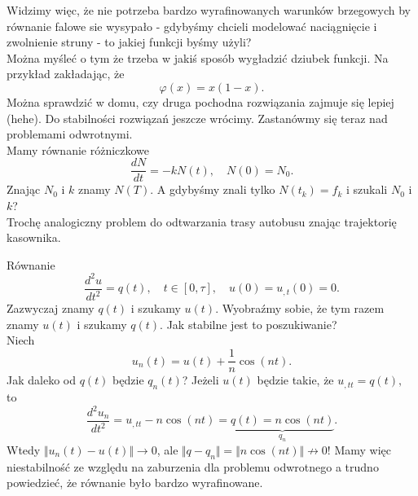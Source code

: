 \documentclass[../main.tex]{subfiles}
\begin{document}
				 Widzimy więc, że nie potrzeba bardzo wyrafinowanych warunków brzegowych by równanie falowe sie wysypało - gdybyśmy chcieli modelować naciągnięcie i zwolnienie struny - to jakiej funkcji byśmy użyli?\\
				Można myśleć o tym że trzeba w jakiś sposób wygładzić dziubek funkcji.
				Na przykład zakładając, że
				\[
						\varphi(x) = x(1-x)
				.\]
				Można sprawdzić w domu, czy druga pochodna rozwiązania zajmuje się lepiej (hehe). Do stabilności rozwiązań jeszcze wrócimy. Zastanówmy się teraz nad problemami odwrotnymi.
				\\
				Mamy równanie różniczkowe
				\[
						\frac{dN}{dt}= -k N(t),\quad N(0) = N_0
				.\]
				Znając $N_0$ i $k$ znamy $N(T)$. A gdybyśmy znali tylko $N(t_k) = f_k$ i szukali $N_0$ i  $k$? \\
				Trochę analogiczny problem do odtwarzania trasy autobusu znając trajektorię kasownika.
				\begin{przyklad}
						Równanie
						\[
								\frac{d^2u}{dt^2} = q(t),\quad t\in [0,\tau],\quad u(0) = u_{,t}(0) = 0
						.\]
						Zazwyczaj znamy $q(t)$ i szukamy $u(t)$. Wyobraźmy sobie, że tym razem znamy $u(t)$ i szukamy $q(t)$. Jak stabilne jest to poszukiwanie?\\
						Niech
						\[
								u_n(t) = u(t) + \frac{1}{n}\cos(nt)
						.\]
						Jak daleko od $q(t)$ będzie $q_n(t)$? Jeżeli $u(t)$ będzie takie, że $u_{,t t} = q(t),$ to \[
								\frac{d^2u_n}{dt^2} = u_{,t t} - n \cos(nt) = \underbrace{q(t) = n \cos(nt)}_{q_n}
						.\]
						Wtedy $\Vert u_n(t) - u(t) \Vert \to 0$, ale $\Vert q - q_n \Vert = \Vert n \cos(nt) \Vert \not\to 0!$ Mamy więc niestabilność ze względu na zaburzenia dla problemu odwrotnego a trudno powiedzieć, że równanie było bardzo wyrafinowane.
				\end{przyklad}
\end{document}
